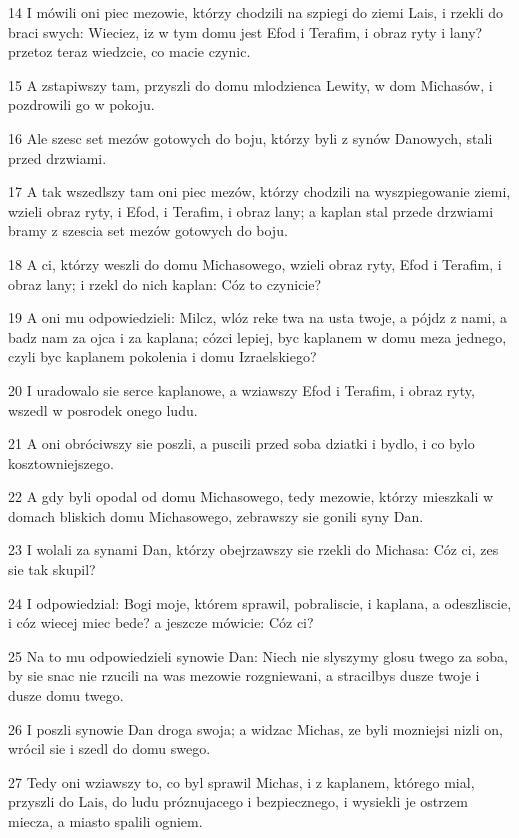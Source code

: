 \par 14 I mówili oni piec mezowie, którzy chodzili na szpiegi do ziemi Lais, i rzekli do braci swych: Wieciez, iz w tym domu jest Efod i Terafim, i obraz ryty i lany? przetoz teraz wiedzcie, co macie czynic.
\par 15 A zstapiwszy tam, przyszli do domu mlodzienca Lewity, w dom Michasów, i pozdrowili go w pokoju.
\par 16 Ale szesc set mezów gotowych do boju, którzy byli z synów Danowych, stali przed drzwiami.
\par 17 A tak wszedlszy tam oni piec mezów, którzy chodzili na wyszpiegowanie ziemi, wzieli obraz ryty, i Efod, i Terafim, i obraz lany; a kaplan stal przede drzwiami bramy z szescia set mezów gotowych do boju.
\par 18 A ci, którzy weszli do domu Michasowego, wzieli obraz ryty, Efod i Terafim, i obraz lany; i rzekl do nich kaplan: Cóz to czynicie?
\par 19 A oni mu odpowiedzieli: Milcz, wlóz reke twa na usta twoje, a pójdz z nami, a badz nam za ojca i za kaplana; cózci lepiej, byc kaplanem w domu meza jednego, czyli byc kaplanem pokolenia i domu Izraelskiego?
\par 20 I uradowalo sie serce kaplanowe, a wziawszy Efod i Terafim, i obraz ryty, wszedl w posrodek onego ludu.
\par 21 A oni obróciwszy sie poszli, a puscili przed soba dziatki i bydlo, i co bylo kosztowniejszego.
\par 22 A gdy byli opodal od domu Michasowego, tedy mezowie, którzy mieszkali w domach bliskich domu Michasowego, zebrawszy sie gonili syny Dan.
\par 23 I wolali za synami Dan, którzy obejrzawszy sie rzekli do Michasa: Cóz ci, zes sie tak skupil?
\par 24 I odpowiedzial: Bogi moje, którem sprawil, pobraliscie, i kaplana, a odeszliscie, i cóz wiecej miec bede? a jeszcze mówicie: Cóz ci?
\par 25 Na to mu odpowiedzieli synowie Dan: Niech nie slyszymy glosu twego za soba, by sie snac nie rzucili na was mezowie rozgniewani, a stracilbys dusze twoje i dusze domu twego.
\par 26 I poszli synowie Dan droga swoja; a widzac Michas, ze byli mozniejsi nizli on, wrócil sie i szedl do domu swego.
\par 27 Tedy oni wziawszy to, co byl sprawil Michas, i z kaplanem, którego mial, przyszli do Lais, do ludu próznujacego i bezpiecznego, i wysiekli je ostrzem miecza, a miasto spalili ogniem.
